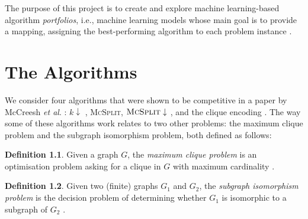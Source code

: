 \documentclass{l4proj}
\theoremstyle{definition}
\newtheorem{definition}{Definition}[chapter]
\theoremstyle{remark}
\begin{document}
The purpose of this project is to create and explore machine learning-based
algorithm \emph{portfolios}, i.e., machine learning models whose main goal is to
provide a mapping, assigning the best-performing algorithm to each problem
instance \cite{DBLP:journals/ai/BischlKKLMFHHLT16, DBLP:journals/ac/Rice76}.

\chapter{The Algorithms}

We consider four algorithms that were shown to be competitive in a paper by
McCreesh \textit{et al}. \cite{DBLP:conf/ijcai/McCreeshPT17}: $k\downarrow$
\cite{DBLP:conf/aaai/HoffmannMR17}, \textsc{McSplit},
$\textsc{McSplit}\downarrow$ \cite{DBLP:conf/ijcai/McCreeshPT17}, and the clique
encoding \cite{DBLP:conf/cp/McCreeshNPS16}. The way some of these algorithms
work relates to two other problems: the maximum clique problem and the subgraph
isomorphism problem, both defined as follows:

\begin{definition}
  Given a graph $G$, the \emph{maximum clique problem} is an optimisation problem
  asking for a clique in $G$ with maximum cardinality
  \cite{DBLP:journals/jgo/PardalosX94a}.
\end{definition}

\begin{definition}
  Given two (finite) graphs $G_1$ and $G_2$, the \emph{subgraph isomorphism
    problem} is the decision problem of determining whether $G_1$ is isomorphic
  to a subgraph of $G_2$ \cite{DBLP:conf/stoc/Cook71}.
\end{definition}
\end{document}
